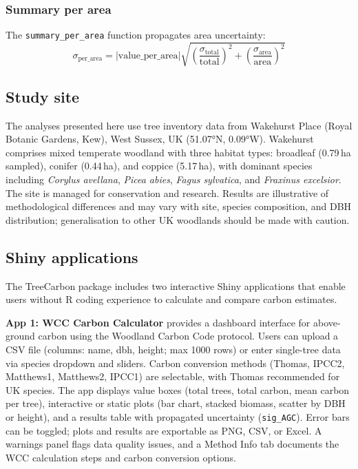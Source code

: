 \documentclass[12pt,a4paper]{article}
\begin{document}
\subsubsection{Summary per area}

The \texttt{summary\_per\_area} function propagates area uncertainty:
\begin{equation}
  \sigma_{\text{per\_area}} = |\text{value\_per\_area}| \sqrt{\left(\frac{\sigma_{\text{total}}}{\text{total}}\right)^2 + \left(\frac{\sigma_{\text{area}}}{\text{area}}\right)^2}
\end{equation}

\subsection{Study site}

The analyses presented here use tree inventory data from Wakehurst Place (Royal Botanic Gardens, Kew), West Sussex, UK (51.07°N, 0.09°W). Wakehurst comprises mixed temperate woodland with three habitat types: broadleaf (0.79\,ha sampled), conifer (0.44\,ha), and coppice (5.17\,ha), with dominant species including \textit{Corylus avellana}, \textit{Picea abies}, \textit{Fagus sylvatica}, and \textit{Fraxinus excelsior}. The site is managed for conservation and research. Results are illustrative of methodological differences and may vary with site, species composition, and DBH distribution; generalisation to other UK woodlands should be made with caution.

\subsection{Shiny applications}

The TreeCarbon package includes two interactive Shiny applications that enable users without R coding experience to calculate and compare carbon estimates.

\textbf{App 1: WCC Carbon Calculator} provides a dashboard interface for above-ground carbon using the Woodland Carbon Code protocol. Users can upload a CSV file (columns: name, dbh, height; max 1000 rows) or enter single-tree data via species dropdown and sliders. Carbon conversion methods (Thomas, IPCC2, Matthews1, Matthews2, IPCC1) are selectable, with Thomas recommended for UK species. The app displays value boxes (total trees, total carbon, mean carbon per tree), interactive or static plots (bar chart, stacked biomass, scatter by DBH or height), and a results table with propagated uncertainty (\texttt{sig\_AGC}). Error bars can be toggled; plots and results are exportable as PNG, CSV, or Excel. A warnings panel flags data quality issues, and a Method Info tab documents the WCC calculation steps and carbon conversion options.
\end{document}
